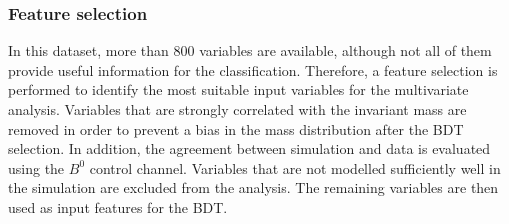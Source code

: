 \subsubsection{Feature selection}
\label{sec:features}
In this dataset, more than $\num{800}$ variables are available, although not all of them provide useful information for the classification. Therefore, a feature selection is performed to identify the most suitable input variables for the multivariate analysis. Variables that are strongly correlated with the invariant mass are removed in order to prevent a bias in the mass distribution after the BDT selection. In addition, the agreement between simulation and data is evaluated using the $B^0$ control channel. Variables that are not modelled sufficiently well in the simulation are excluded from the analysis. The remaining variables are then used as input features for the BDT.


